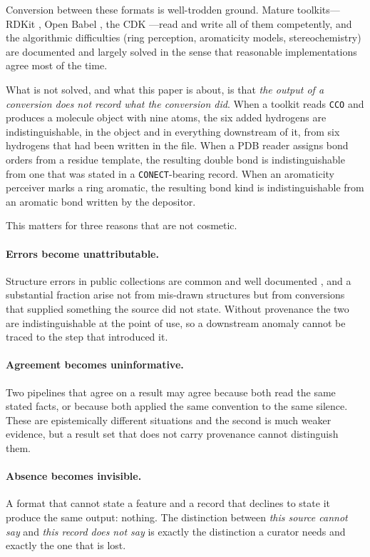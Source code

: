 \documentclass[11pt,twocolumn,a4paper]{article}
\theoremstyle{msthm}
\theoremstyle{definition}
\theoremstyle{remark}
\newcommand{\ms}[1]{\texttt{#1}}
\begin{document}
Conversion between these formats is well-trodden ground. Mature
toolkits---RDKit \citep{rdkit}, Open Babel \citep{oboyle2011openbabel},
the CDK \citep{willighagen2017cdk}---read and write all of them
competently, and the algorithmic difficulties (ring perception,
aromaticity models, stereochemistry) are documented and largely solved
in the sense that reasonable implementations agree most of the time.

What is not solved, and what this paper is about, is that \emph{the
output of a conversion does not record what the conversion did}. When a
toolkit reads \ms{CCO} and produces a molecule object with nine atoms,
the six added hydrogens are indistinguishable, in the object and in
everything downstream of it, from six hydrogens that had been written in
the file. When a PDB reader assigns bond orders from a residue template,
the resulting double bond is indistinguishable from one that was stated
in a \ms{CONECT}-bearing record. When an aromaticity perceiver marks a
ring aromatic, the resulting bond kind is indistinguishable from an
aromatic bond written by the depositor.

This matters for three reasons that are not cosmetic.

\paragraph{Errors become unattributable.} Structure errors in public
collections are common and well documented
\citep{young2008errors,fourches2010curation,williams2012quality,%
akhondi2012consistency}, and a substantial fraction arise not from
mis-drawn structures but from conversions that supplied something the
source did not state. Without provenance the two are indistinguishable
at the point of use, so a downstream anomaly cannot be traced to the
step that introduced it.

\paragraph{Agreement becomes uninformative.} Two pipelines that agree on
a result may agree because both read the same stated facts, or because
both applied the same convention to the same silence. These are
epistemically different situations and the second is much weaker
evidence, but a result set that does not carry provenance cannot
distinguish them.

\paragraph{Absence becomes invisible.} A format that cannot state a
feature and a record that declines to state it produce the same output:
nothing. The distinction between \emph{this source cannot say} and
\emph{this record does not say} is exactly the distinction a curator
needs and exactly the one that is lost.
\end{document}
